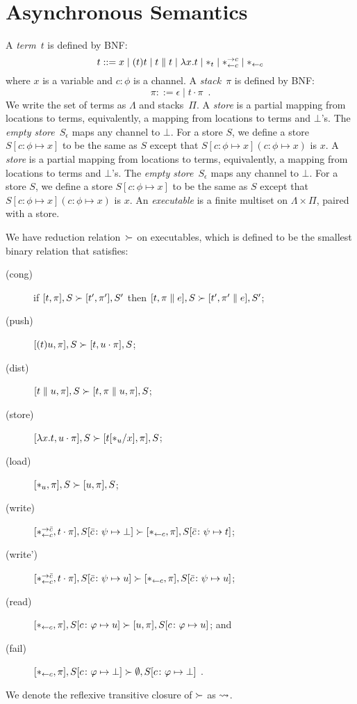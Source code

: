 \section{Asynchronous Semantics}

A \textit{term}~$t$ is defined by BNF:
\[
 t::= x
 \mid (t)t
 \mid t\parallel t
 \mid \lambda x.t
 \mid \ast_t
 \mid \ast^{\rightarrow {c}}_{\leftarrow{c}}
 \mid \ast_{\leftarrow{c}}
\]
where $x$ is a variable and $c\colon\phi$ is a channel.
A \textit{stack}~$\pi$ is defined by BNF:
\[
 \pi ::= \epsilon
 \mid t\cdot \pi
 \enspace.
\]
We write the set of terms as $\Lambda$ and stacks~$\Pi$.
A \textit{store} is a partial mapping from locations to
terms, equivalently, a mapping from locations to terms and $\bot$'s.
The \textit{empty store}~$S_\epsilon$ maps any channel to $\bot$.
For a store $S$, we define a store $S[c\colon\phi\mapsto x]$ to be
the same as $S$ except that $S[c\colon\phi\mapsto x](c\colon\phi\mapsto
x)$ is $x$.
A \textit{store} is a partial mapping from locations to
terms, equivalently, a mapping from locations to terms and $\bot$'s.
The \textit{empty store}~$S_\epsilon$ maps any channel to $\bot$.
For a store $S$, we define a store $S[c\colon\phi\mapsto x]$ to be
the same as $S$ except that $S[c\colon\phi\mapsto x](c\colon\phi\mapsto
x)$ is $x$.
An \textit{executable} is a finite multiset on $\Lambda \times \Pi$,
paired with a store.

We have reduction relation~$\succ$ on executables,
which is defined to be the smallest binary relation
that satisfies:
\begin{description}
 \item[(cong)] if
	    $[t,\pi],         S \succ [ t',\pi'],        S'$
	    then
	    $[t,\pi \parallel e], S \succ [ t',\pi'\parallel e], S'$\enspace;
 \item[(push)]
	    $[(t)u,\pi],S       \succ [t,u\cdot\pi],S$;
 \item[(dist)]
	    $[t\parallel u,\pi],S   \succ [t,\pi\parallel u,\pi],S$\enspace;
 \item[(store)]
	    $[\lambda x.t,u\cdot\pi],S
	     \succ
	     [t[\ast_u/x],      \pi],S$\enspace;
 \item[(load)]
	    $[\ast_u,\pi],S\succ[u,\pi],S$\enspace;
 \item[(write)]
	    $
	    [\ast^{\rightarrow {\bar{c}}}_{\leftarrow{c}}, t\cdot\pi], S[\bar{c}\colon\psi\mapsto\bot]
	    \succ
	    [\ast_{\leftarrow{c}}, \pi],
	    S[\bar{c}\colon\psi\mapsto t]
	    $\enspace;
 \item[(write')]
	    $
	    [\ast^{\rightarrow {\bar{c}}}_{\leftarrow{c}}, t\cdot\pi], S[\bar{c}\colon\psi\mapsto u]
	    \succ
	    [\ast_{\leftarrow{c}}, \pi],
	    S[\bar{c}\colon\psi\mapsto u]
	    $\enspace;
 \item[(read)]$
	    [\ast_{\leftarrow{c}} ,\pi],
	    S[c\colon\varphi\mapsto u]
	    \succ
	    [u,\pi],
	    S[c\colon\varphi\mapsto u]
	    $\enspace; and
 \item[(fail)]
	    $
	    [\ast_{\leftarrow{c}},\pi],
	    S[c\colon\varphi\mapsto \bot]
	    \succ
	    \emptyset,S[c\colon\varphi\mapsto \bot]
	    $
	    \enspace.
\end{description}
We denote the reflexive transitive closure of $\succ$ as $\rightsquigarrow$.


